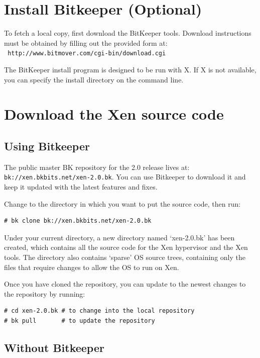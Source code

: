 \documentclass[11pt,twoside,final,openright]{xenstyle}
\begin{document}
\section{Install Bitkeeper (Optional)}

To fetch a local copy, first download the BitKeeper tools.
Download instructions must be obtained by filling out the provided
form at: \\ {\tt
http://www.bitmover.com/cgi-bin/download.cgi }

The BitKeeper install program is designed to be run with X.  If X is
not available, you can specify the install directory on the command
line.

\section{Download the Xen source code}

\subsection{Using Bitkeeper}

The public master BK repository for the 2.0 release lives at: \\
{\tt bk://xen.bkbits.net/xen-2.0.bk}.  You can use Bitkeeper to
download it and keep it updated with the latest features and fixes.

Change to the directory in which you want to put the source code, then
run:
\begin{verbatim}
# bk clone bk://xen.bkbits.net/xen-2.0.bk
\end{verbatim}

Under your current directory, a new directory named `xen-2.0.bk' has
been created, which contains all the source code for the Xen
hypervisor and the Xen tools.  The directory also contains `sparse' OS
source trees, containing only the files that require changes to allow
the OS to run on Xen.

Once you have cloned the repository, you can update to the newest
changes to the repository by running:
\begin{verbatim}
# cd xen-2.0.bk # to change into the local repository
# bk pull       # to update the repository
\end{verbatim}

\subsection{Without Bitkeeper}
\end{document}
